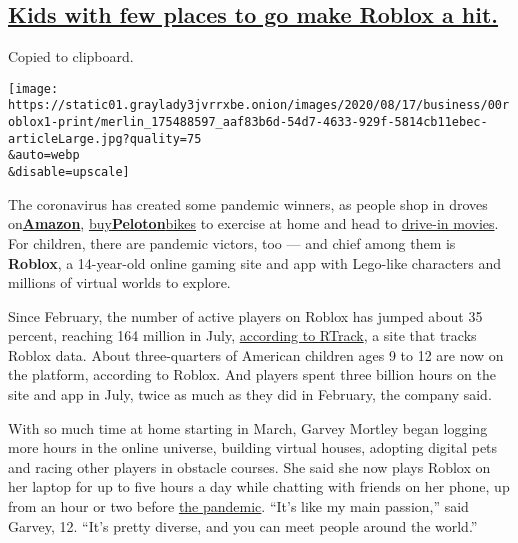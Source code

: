 \hypertarget{kids-with-few-places-to-go-make-roblox-a-hit}{%
\subsection{\texorpdfstring{\protect\hyperlink{kids-with-few-places-to-go-make-roblox-a-hit}{Kids
with few places to go make Roblox a
hit.}}{Kids with few places to go make Roblox a hit.}}\label{kids-with-few-places-to-go-make-roblox-a-hit}}

Copied to clipboard.

\texttt{[image: https://static01.graylady3jvrrxbe.onion/images/2020/08/17/business/00roblox1-print/merlin\_175488597\_aaf83b6d-54d7-4633-929f-5814cb11ebec-articleLarge.jpg?quality=75\\\&auto=webp\\\&disable=upscale]}

The coronavirus has created some pandemic winners, as people shop in
droves
on\href{https://www.nytimes3xbfgragh.onion/live/2020/07/30/business/stock-market-today-coronavirus\#amazons-earnings-double-as-sales-surge}{}\textbf{\href{https://www.nytimes3xbfgragh.onion/live/2020/07/30/business/stock-market-today-coronavirus\#amazons-earnings-double-as-sales-surge}{Amazon}},
\href{https://www.nytimes3xbfgragh.onion/2020/05/06/technology/peloton-boom-workout-virus.html}{buy}\textbf{\href{https://www.nytimes3xbfgragh.onion/2020/05/06/technology/peloton-boom-workout-virus.html}{Peloton}}\href{https://www.nytimes3xbfgragh.onion/2020/05/06/technology/peloton-boom-workout-virus.html}{bikes}
to exercise at home and head to
\href{https://www.nytimes3xbfgragh.onion/2020/03/24/style/drive-in-theaters-coronavirus.html}{drive-in
movies}. For children, there are pandemic victors, too --- and chief
among them is \textbf{Roblox}, a 14-year-old online gaming site and app
with Lego-like characters and millions of virtual worlds to explore.

Since February, the number of active players on Roblox has jumped about
35 percent, reaching 164 million in July,
\href{https://blog.rtrack.live/index.php/2020/08/02/roblox-continues-upward-ascent-with-164-million-monthly-active-users/}{according
to RTrack}, a site that tracks Roblox data. About three-quarters of
American children ages 9 to 12 are now on the platform, according to
Roblox. And players spent three billion hours on the site and app in
July, twice as much as they did in February, the company said.

With so much time at home starting in March, Garvey Mortley began
logging more hours in the online universe, building virtual houses,
adopting digital pets and racing other players in obstacle courses. She
said she now plays Roblox on her laptop for up to five hours a day while
chatting with friends on her phone, up from an hour or two before
\href{https://www.nytimes3xbfgragh.onion/news-event/coronavirus?name=styln-coronavirus-national\&region=TOP_BANNER\&variant=1_Show\&block=storyline_menu_recirc\&action=click\&pgtype=Interactive\&impression_id=cfb8d020-dd71-11ea-bf10-75191c97e453}{the
pandemic}. ``It's like my main passion,'' said Garvey, 12. ``It's pretty
diverse, and you can meet people around the world.''

